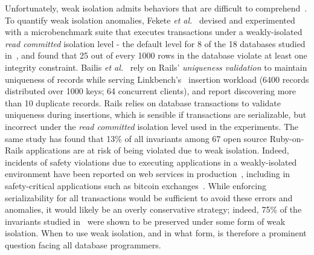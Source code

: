 Unfortunately, weak isolation admits behaviors that are difficult to
comprehend~\cite{berenson}. To quantify weak isolation anomalies,
Fekete \emph{et al.}~\cite{feketevldb09} devised and experimented
with a microbenchmark suite that executes transactions under a
weakly-isolated \emph{read committed} isolation level - the default
level for 8 of the 18 databases studied in~\cite{bailishotos}, and
found that 25 out of every 1000 rows in the database violate at least
one integrity constraint. Bailis \emph{et al.}~\cite{bailisferal} rely
on Rails' \emph{uniqueness validation} to maintain uniqueness of
records while serving Linkbench's~\cite{linkbench} insertion workload
(6400 records distributed over 1000 keys; 64 concurrent clients), and
report discovering more than 10 duplicate records.  Rails relies on
database transactions to validate uniqueness during insertions, which
is sensible if transactions are serializable, but incorrect under the
\emph{read committed} isolation level used in the experiments. The
same study has found that 13\% of all invariants among 67 open source
Ruby-on-Rails applications are at risk of being violated due to weak
isolation. Indeed, incidents of safety violations due to executing
applications in a weakly-isolated environment have been reported on
web services in production~\cite{starbucksbug, scimedbug}, including
in safety-critical applications such as bitcoin
exchanges~\cite{poloniexbug, bitcoinbug}. While enforcing
serializability for all transactions would be sufficient to avoid
these errors and anomalies, it would likely be an overly conservative
strategy; indeed, 75\% of the invariants studied in~\cite{bailisferal}
were shown to be preserved under some form of weak isolation.  When to
use weak isolation, and in what form, is therefore a prominent
question facing all database programmers.

